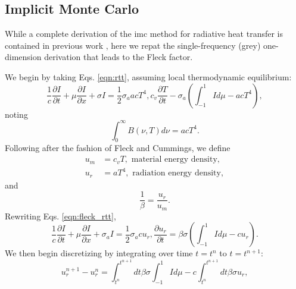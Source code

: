 \subsection{Implicit Monte Carlo}
While a complete derivation of the \gls{imc} method for radiative heat transfer is contained in previous work \cite{FleckCumm}, here we repat the single-frequency (grey) one-dimension derivation that leads to the Fleck factor.

We begin by taking Eqs. \ref{eqn:rtt}, assuming local thermodynamic equilibrium:
\begin{subequations}\label{eqn:fleck_rtt}
\begin{equation}
\frac{1}{c}\frac{\partial I}{\partial t}+\mu\frac{\partial I}{\partial x}+\sigma I = 
    \frac{1}{2}\sigma_a a c T^4,
\end{equation}
\begin{equation}
c_v\frac{\partial T}{\partial t} - \sigma_a\left(\int_{-1}^1Id\mu-acT^4\right),
\end{equation}
\end{subequations}
noting 
\begin{equation}
\int_0^\infty B(\nu,T)d\nu = acT^4.
\end{equation}
Following after the fashion of Fleck and Cummings, we define
\begin{align}
u_m &= c_vT, \mbox{ material energy density},\\
u_r &=aT^4, \mbox{ radiation energy density},
\end{align}
and 
\begin{equation}
\frac{1}{\beta}=\frac{u_r}{u_m}.
\end{equation}
Rewriting Eqs. \ref{eqn:fleck_rtt},
\begin{subequations}
\begin{equation}\label{eqn:fleck_dens_trans}
\frac{1}{c}\frac{\partial I}{\partial t}+\mu\frac{\partial I}{\partial x}+\sigma_a I = 
    \frac{1}{2}\sigma_a c u_r,
\end{equation}
\begin{equation}\label{eqn:fleck_dens_mat}
\frac{\partial u_r}{\partial t} = \beta\sigma\left(\int_{-1}^1 Id\mu-cu_r\right).
\end{equation}
\end{subequations}
We then begin discretizing by integrating over time $t=t^n$ to $t=t^{n+1}$:
\begin{equation}
u_r^{n+1}-u_r^n=\int_{t^n}^{t^{n+1}}dt\beta\sigma\int_{-1}^1Id\mu -c\int_{t^n}^{t^{n+1}}dt\beta\sigma u_r,
\end{equation}
